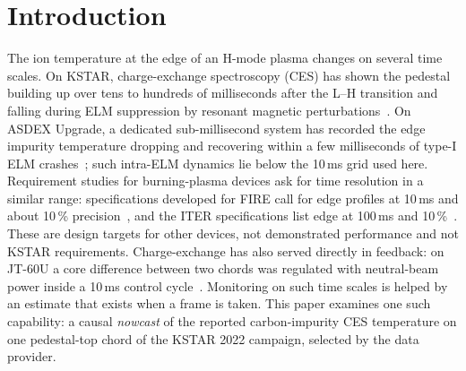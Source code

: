 \section{Introduction}
\label{sec:intro}

The ion temperature \Ti{} at the edge of an H-mode plasma changes on several time scales. On KSTAR, charge-exchange spectroscopy (CES) has shown the \Ti{} pedestal building up over tens to hundreds of milliseconds after the L--H transition and falling during ELM suppression by resonant magnetic perturbations~\citep{Ko2015IonTemperature}. On ASDEX Upgrade, a dedicated sub-millisecond system has recorded the edge impurity temperature dropping and recovering within a few milliseconds of type-I ELM crashes~\citep{Viezzer2018IonHeat}; such intra-ELM dynamics lie below the 10\,ms grid used here. Requirement studies for burning-plasma devices ask for time resolution in a similar range: specifications developed for FIRE call for edge \Ti{} profiles at 10\,ms and about 10\,\% precision~\citep{Young2008PlasmaMeasurements}, and the ITER specifications list edge \Ti{} at 100\,ms and 10\,\%~\citep{Donne2007ChapterDiagnostics}. These are design targets for other devices, not demonstrated performance and not KSTAR requirements. Charge-exchange \Ti{} has also served directly in feedback: on JT-60U a core \Ti{} difference between two chords was regulated with neutral-beam power inside a 10\,ms control cycle~\citep{Yoshida2009RealTime}. Monitoring on such time scales is helped by an estimate that exists when a frame is taken. This paper examines one such capability: a causal \emph{nowcast} of the reported carbon-impurity CES temperature on one pedestal-top chord of the KSTAR 2022 campaign, selected by the data provider.

